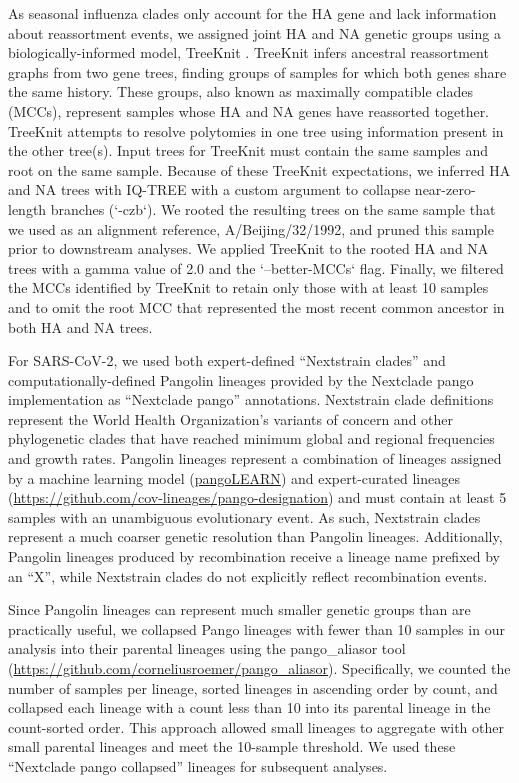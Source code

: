 \documentclass[10pt,letterpaper]{article}
\begin{document}
As seasonal influenza clades only account for the HA gene and lack information about reassortment events, we assigned joint HA and NA genetic groups using a biologically-informed model, TreeKnit \cite{Barrat-Charlaix2022}.
TreeKnit infers ancestral reassortment graphs from two gene trees, finding groups of samples for which both genes share the same history.
These groups, also known as maximally compatible clades (MCCs), represent samples whose HA and NA genes have reassorted together.
TreeKnit attempts to resolve polytomies in one tree using information present in the other tree(s).
Input trees for TreeKnit must contain the same samples and root on the same sample.
Because of these TreeKnit expectations, we inferred HA and NA trees with IQ-TREE with a custom argument to collapse near-zero-length branches (`-czb`).
We rooted the resulting trees on the same sample that we used as an alignment reference, A/Beijing/32/1992, and pruned this sample prior to downstream analyses.
We applied TreeKnit to the rooted HA and NA trees with a gamma value of 2.0 and the `--better-MCCs` flag.
Finally, we filtered the MCCs identified by TreeKnit to retain only those with at least 10 samples and to omit the root MCC that represented the most recent common ancestor in both HA and NA trees.

For SARS-CoV-2, we used both expert-defined ``Nextstrain clades'' \cite{Hodcroft2020,Bedford2021,Roemer2022} and computationally-defined Pangolin lineages \cite{OToole2021} provided by the Nextclade pango implementation as ``Nextclade pango'' annotations.
Nextstrain clade definitions represent the World Health Organization's variants of concern and other phylogenetic clades that have reached minimum global and regional frequencies and growth rates.
Pangolin lineages represent a combination of lineages assigned by a machine learning model (\href{https://cov-lineages.org/resources/pangolin/pangolearn.html}{pangoLEARN}) and expert-curated lineages (\href{https://github.com/cov-lineages/pango-designation}{https://github.com/cov-lineages/pango-designation}) and must contain at least 5 samples with an unambiguous evolutionary event.
As such, Nextstrain clades represent a much coarser genetic resolution than Pangolin lineages.
Additionally, Pangolin lineages produced by recombination receive a lineage name prefixed by an ``X'', while Nextstrain clades do not explicitly reflect recombination events.

Since Pangolin lineages can represent much smaller genetic groups than are practically useful, we collapsed Pango lineages with fewer than 10 samples in our analysis into their parental lineages using the pango\_aliasor tool (\href{https://github.com/corneliusroemer/pango_aliasor}{https://github.com/corneliusroemer/pango\_aliasor}).
Specifically, we counted the number of samples per lineage, sorted lineages in ascending order by count, and collapsed each lineage with a count less than 10 into its parental lineage in the count-sorted order.
This approach allowed small lineages to aggregate with other small parental lineages and meet the 10-sample threshold.
We used these ``Nextclade pango collapsed'' lineages for subsequent analyses.
\end{document}
